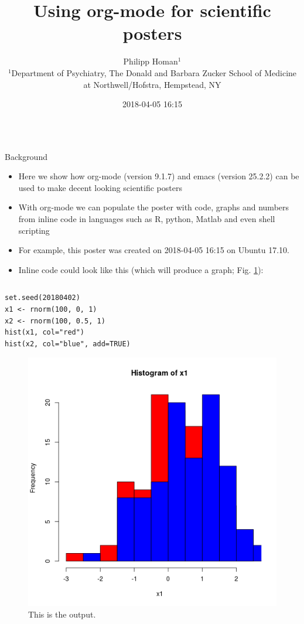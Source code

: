 \documentclass[final]{beamer}
\date{}
\author{
Philipp Homan$^{1}$
\\
\normalsize{$^{1}$Department of Psychiatry,}
\normalsize{The Donald and Barbara Zucker}
\normalsize{School of Medicine at Northwell/Hofstra,}
\normalsize{Hempstead, NY}
}
\date{2018-04-05 16:15}
\title{Using org-mode for scientific posters}
\begin{document}
\begin{frame}[fragile,label={sec:org2358f68}]{}
 \begin{columns}
\begin{column}[t]{0.45\columnwidth}
\begin{block}{Background}
\begin{itemize}
\item Here we show how org-mode (version 
9.1.7) and emacs (version 
25.2.2) can be used to make decent looking scientific
posters
\item With org-mode we can populate the poster with code, graphs and numbers
from inline code in languages such as R, python, Matlab and even shell
scripting
\item For example, this poster was created on 2018-04-05 16:15 on
Ubuntu 17.10.
\item Inline code could look like this (which will produce a graph; 
Fig. \ref{fig:org4461949}):
\end{itemize}

\begin{columns}
\begin{column}[T]{0.68\columnwidth}
\begin{verbatim}
set.seed(20180402)
x1 <- rnorm(100, 0, 1)
x2 <- rnorm(100, 0.5, 1)
hist(x1, col="red")
hist(x2, col="blue", add=TRUE)
\end{verbatim}

\begin{figure}[htbp]
\centering
\includegraphics[width=.9\linewidth]{3.png}
\caption{\label{fig:org4461949}
This is the output.}
\end{figure}
\end{column}
\end{columns}
\end{block}


\end{column}
\end{columns}
\end{frame}
\end{document}
